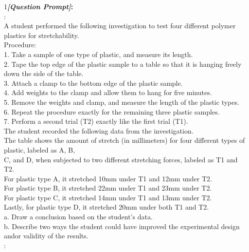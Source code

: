 \begin{figure*}
\begin{tcolorbox}[
    colback=gray!10,      %
    colframe=gray!80,     %
    title=Case Study 4,
    fonttitle=\bfseries,  %
    rounded corners,
    boxrule=0.5mm,        %
    width=\linewidth
]
\scriptsize
\textcircled{\raisebox{-0.3pt} {\scriptsize1}}\textbf{\emph{[Question Prompt]}:}\\
\text{[Question]}: \\
A student performed the following investigation to test four different polymer plastics for stretchability.\\
Procedure:\\
1. Take a sample of one type of plastic, and measure its length.\\
2. Tape the top edge of the plastic sample to a table so that it is hanging freely down the side of the table.\\
3. Attach a clamp to the bottom edge of the plastic sample.\\
4. Add weights to the clamp and allow them to hang for five minutes.\\
5. Remove the weights and clamp, and measure the length of the plastic types.\\
6. Repeat the procedure exactly for the remaining three plastic samples.\\
7. Perform a second trial (T2) exactly like the first trial (T1).\\
The student recorded the following data from the investigation.\\
The table shows the amount of stretch (in millimeters) for four different types of plastic, labeled as A, B,\\
C, and D, when subjected to two different stretching forces, labeled as T1 and T2.\\
For plastic type A, it stretched 10mm under T1 and 12mm under T2.\\
For plastic type B, it stretched 22mm under T1 and 23mm under T2.\\
For plastic type C, it stretched 14mm under T1 and 13mm under T2.\\
Lastly, for plastic type D, it stretched 20mm under both T1 and T2.\\
a. Draw a conclusion based on the student's data.\\
b. Describe two ways the student could have improved the experimental design and\/or validity of the results.\\
:\\

\end{tcolorbox}
\end{figure*}
